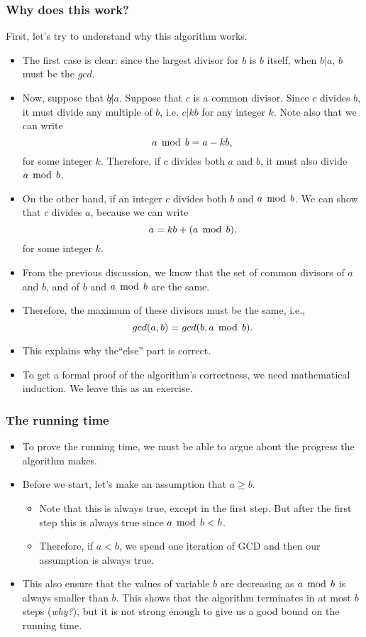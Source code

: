 \begin{frame}\frametitle{Why does this work?}
  First, let's try to understand why this algorithm works.

  \begin{itemize}
    \item The first case is clear: since the largest divisor for $b$
      is $b$ itself, when $b|a$, $b$ must be the $gcd$.
    \item Now, suppose that $b\not|a$.  Suppose that $c$ is a common
      divisor.  Since $c$ divides $b$, it must divide any multiple of
      $b$, i.e. $c|kb$ for any integer $k$. Note also that we can
      write
      \[ a\,\bmod\, b = a - kb, \]
      for some integer $k$.  Therefore, if $c$ divides both $a$ and
      $b$, it must also divide $a\,\bmod\, b$.
    \item On the other hand, if an integer $c$ divides both $b$ and
      $a\,\bmod\, b$. We can show that $c$ divides $a$, because we can
      write
      \[ a = kb + (a\,\bmod\, b), \]
      for some integer $k$.
  \end{itemize}
\end{frame}

\begin{frame}
  \begin{itemize}
  \item
    From the previous discussion, we know that the set of common
    divisors of $a$ and $b$, and of $b$ and $a\,\bmod\, b$ are the same.
  \item
    Therefore, the maximum of these divisors must be the same, i.e.,
    \[ gcd(a,b) = gcd(b,a\,\bmod\, b). \]
  \item This explains why the``else'' part is correct.
  \item To get a formal proof of the algorithm's correctness, we need
    mathematical induction.  We leave this as an exercise.
  \end{itemize}
\end{frame}

\begin{frame}\frametitle{The running time}
  \begin{itemize}
  \item To prove the running time, we must be able to argue about the
    progress the algorithm makes.
  \item Before we start, let's make an assumption that $a\geq b$.
    \begin{itemize}
    \item
      Note that this is always true, except in the first step.  But
      after the first step this is always true since $a\,\bmod\, b < b$.
    \item
      Therefore, if $a<b$, we spend one iteration of GCD and then our
      assumption is always true.
    \end{itemize}
  \item This also ensure that the values of variable $b$ are
    decreasing as $a\,\bmod\, b$ is always smaller than $b$.  This shows
    that the algorithm terminates in at most $b$ steps ({\em why?}),
    but it is not strong enough to give us a good bound on the running
    time.
  \end{itemize}
\end{frame}

